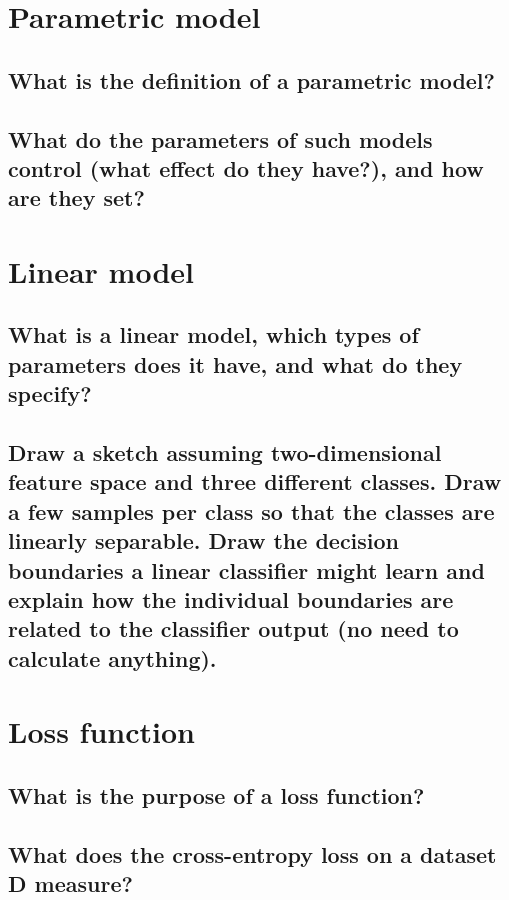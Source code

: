 \section{Parametric model}

\subsection{What is the definition of a parametric model?}

\subsection{What do the parameters of such models control (what effect do they have?), and how are they set?}

\section{Linear model}

\subsection{What is a linear model, which types of parameters does it have, and what do they specify?}

\subsection{Draw a sketch assuming two-dimensional feature space and three different classes. Draw a few samples per class so that the classes are linearly separable. Draw the decision boundaries a linear classifier might learn and explain how the individual boundaries are related to the classifier output (no need to calculate anything).}

\section{Loss function}

\subsection{What is the purpose of a loss function?}

\subsection{What does the cross-entropy loss on a dataset D measure?}

